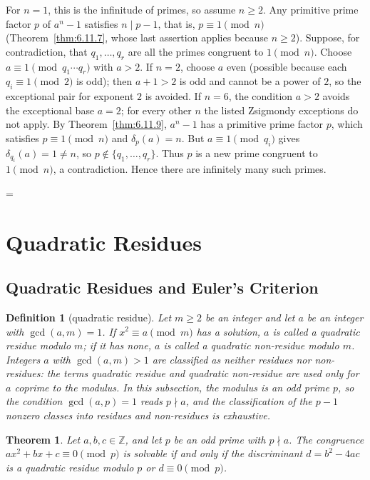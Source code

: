 \documentclass[11pt]{article}
\makeatletter
\theoremstyle{ntstyle}
\newtheorem{theorem}{Theorem}[subsection]
\newtheorem{definition}{Definition}[subsection]
\let\nt@closedisplay\]
\def\nt@guardedclose{\@ifnextchar\par{\nt@closeafterpar}{\@ifnextchar\end{\postdisplaypenalty\@M\nt@closedisplay}{\nt@closedisplay}}}
\def\nt@closeafterpar\par{\@ifnextchar\par{\nt@closeafterpar}{\@ifnextchar\end{\postdisplaypenalty\@M\nt@closedisplay\par}{\nt@closedisplay\par}}}
\renewenvironment{proof}[1][\proofname]{\par
  \pushQED{\qed}\normalfont\topsep\medskipamount\edef\nt@afterproof{\@endparpenalty=\the\@endparpenalty\relax}\@beginparpenalty\@M\@endparpenalty\@M\let\]\nt@guardedclose\trivlist\item[]\textit{#1\@addpunct{.}} \ignorespaces}{\ifvmode\addpenalty\@M\fi\popQED\nt@afterproof\endtrivlist\@endpefalse}
\makeatother
\begin{document}
\begin{proof} For $n = 1$, this is the infinitude of
	primes, so assume $n \ge 2$. Any primitive prime factor $p$ of $a^{n} -
		1$ satisfies $n \mid p - 1$, that is, $p \equiv 1 \pmod{n}$ (Theorem~\ref{thm:6.11.7}, whose last assertion applies because $n \ge 2$). Suppose, for contradiction, that $q_1, \ldots, q_r$ are all
	the primes congruent to $1 \pmod{n}$. Choose $a\equiv1\pmod{q_1\cdots q_r}$ with $a>2$. If $n=2$, choose $a$ even (possible because each $q_i\equiv1\pmod 2$ is odd); then $a+1>2$ is odd and cannot be a power of $2$, so the exceptional pair for exponent $2$ is avoided. If $n=6$, the condition $a>2$ avoids the exceptional base $a=2$; for every other $n$ the listed Zsigmondy exceptions do not apply. By Theorem~\ref{thm:6.11.9}, $a^{n} - 1$ has a primitive
	prime factor $p$, which satisfies $p \equiv 1 \pmod{n}$ and
	$\delta_p(a) = n$. But $a \equiv 1 \pmod{q_i}$ gives
	$\delta_{q_i}(a) = 1 \neq n$, so $p \notin \{q_1, \ldots,
		q_r\}$. Thus $p$ is a new prime congruent to $1 \pmod{n}$, a contradiction. Hence there
	are infinitely many such primes.

\end{proof}
\clearpage

\section{Quadratic Residues}

\subsection{Quadratic Residues and Euler's Criterion}

\begin{definition}[quadratic residue]\label{def:7.1.1} Let $m \ge 2$ be an integer and let
	$a$ be an integer with $\gcd(a, m) = 1$. If $x^{2} \equiv a \pmod{m}$
	has a solution, $a$ is called a quadratic residue modulo $m$; if it
	has none, $a$ is called a quadratic non-residue modulo $m$. Integers
	$a$ with $\gcd(a, m) > 1$ are classified as neither residues nor non-residues: the terms
	quadratic residue and quadratic non-residue are used only for $a$
	coprime to the modulus. In this subsection, the modulus is an odd prime
	$p$, so the condition $\gcd(a, p) = 1$ reads $p \nmid a$, and the
	classification of the $p-1$ nonzero classes into residues and
	non-residues is exhaustive.

\end{definition}
\begin{theorem}\label{thm:7.1.1} Let $a,b,c\in\mathbb{Z}$, and let $p$ be an odd prime with $p \nmid a$. The congruence
	$ax^{2} + bx + c \equiv 0 \pmod{p}$ is solvable if and only if the
	discriminant $d = b^{2} - 4ac$ is a quadratic residue modulo $p$ or
	$d \equiv 0 \pmod{p}$.

\end{theorem}
\end{document}
